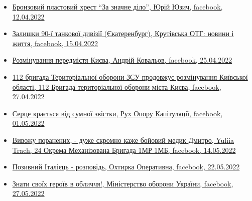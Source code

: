 \begin{itemize} %

\item \hyperlink{12_04_2022.fb.juzych_jurij.1.plast_krest_nagrada}{%
Бронзовий пластовий хрест \enquote{За значне діло}, Юрій Юзич, facebook, 12.04.2022%
}



\item \hyperlink{15_04_2022.fb.krutivska_otg.1.zalyshky_divizii_ekaterinburg}{%
Залишки 90-ї танкової дивізії (Єкатеренбург), Крутівська ОТГ: новини і життя, %
facebook, 15.04.2022%
}

\item \hyperlink{25_04_2022.fb.kovalov_andrij.1.razminirovanie_predmestij_kieva}{%
Розмінування передмістя Києва, Андрій Ковальов, facebook, 25.04.2022%
}

\item \hyperlink{27_04_2022.fb.teroborona_ua.kiev.112.br.1.rozminuvannja_kiev_obl}{%
112 бригада Територіальної оборони ЗСУ продовжує розмінування Київської області, %
112 Бригада територіальної оборони міста Києва, facebook, 27.04.2022%
}

\item \hyperlink{01_05_2022.fb.fb_group.ruh_oporu_kapituljacii.1.smert_ruslan_borovik}{%
Серце крається від сумної звістки, Рух Опору Капітуляції, facebook, 01.05.2022%
}

\item \hyperlink{14_05_2022.fb.fb_group.ua.armia.24_ombr.1mp.1mb.1.medik}{%
Вивожу поранених, - дуже скромно каже бойовий медик Дмитро, Yuliia Trach, 24 Окрема Механізована Бригада 1МР 1МБ, %
facebook, 14.05.2022%
}

\item \hyperlink{22_05_2022.fb.fb_group.ohtyrka_operatyvna.1.pozyvnyj_italiec}{%
Позивний Італієць - розповідь, Охтирка Оперативна, facebook, 22.05.2022%
}

\item \hyperlink{27_05_2022.fb.ua.minoborony.1.znaty_geroiv}{%
Знати своїх героїв в обличчя!, Міністерство оборони України, facebook, 27.05.2022%
}

\end{itemize} %
